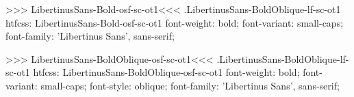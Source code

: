 >>>
\<LibertinusSans-Bold-osf-sc-ot1\><<<
.LibertinusSans-BoldOblique-lf-sc-ot1
htfcss:  LibertinusSans-Bold-osf-sc-ot1  font-weight: bold; font-variant: small-caps; font-family: 'Libertinus Sans', sans-serif;

>>>
\<LibertinusSans-BoldOblique-osf-sc-ot1\><<<
.LibertinusSans-BoldOblique-lf-sc-ot1
htfcss:  LibertinusSans-BoldOblique-osf-sc-ot1  font-weight: bold; font-variant: small-caps; font-style: oblique; font-family: 'Libertinus Sans', sans-serif;

